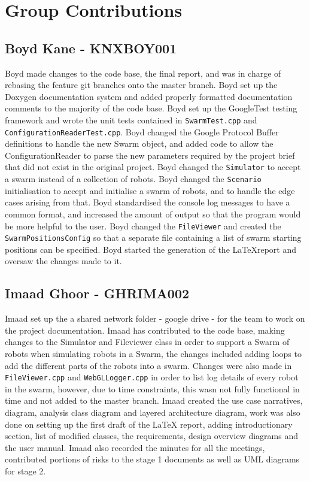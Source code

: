 \documentclass[11pt,a4paper]{article}
\begin{document}
\section{Group Contributions}
\label{s:group-contributions}

\subsection{Boyd Kane - KNXBOY001}
Boyd made changes to the code base, the final report, and was in charge of
rebasing the feature git branches onto the master branch. Boyd set up the
Doxygen documentation system and added properly formatted documentation comments
to the majority of the code base. Boyd set up the GoogleTest testing framework
and wrote the unit tests contained in \texttt{SwarmTest.cpp} and
\texttt{ConfigurationReaderTest.cpp}. Boyd changed the Google Protocol Buffer
definitions to handle the new Swarm object, and added code to allow the
ConfigurationReader to parse the new parameters required by the project brief
that did not exist in the original project. Boyd changed the
\texttt{Simulator} to accept a swarm instead of a collection of robots. Boyd
changed the \texttt{Scenario} initialisation to accept and initialise a swarm
of robots, and to handle the edge cases arising from that. Boyd standardised
the console log messages to have a common format, and increased the amount of
output so that the program would be more helpful to the user. Boyd changed the
\texttt{FileViewer} and created the \texttt{SwarmPositionsConfig} so that a
separate file containing a list of swarm starting positions can be specified.
Boyd started the generation of the \LaTeX report and oversaw the changes made
to it.

\subsection{Imaad Ghoor - GHRIMA002}
Imaad set up the a shared network folder - google drive - for the team to work
on the project documentation. Imaad has contributed to the code base, making changes
to the Simulator and Fileviewer class in order to support a Swarm of robots when
simulating robots in a Swarm, the changes included adding loops to add the different parts
of the robots into a swarm. Changes were also made in \texttt{FileViewer.cpp} and \texttt{WebGLLogger.cpp}
in order to list log details of every robot in the swarm, however, due to time constraints, this wasn not
fully functional in time and not added to the master branch. Imaad created the use case narratives, diagram,
analysis class diagram and layered architecture diagram, work was also done on setting
up the first draft of the LaTeX report, adding introductionary section, list of modified classes,
the requirements, design overview diagrams and the user manual. Imaad also recorded the minutes for all the meetings,
contributed portions of risks to the stage 1 documents as well as UML diagrams for stage 2.
\end{document}
